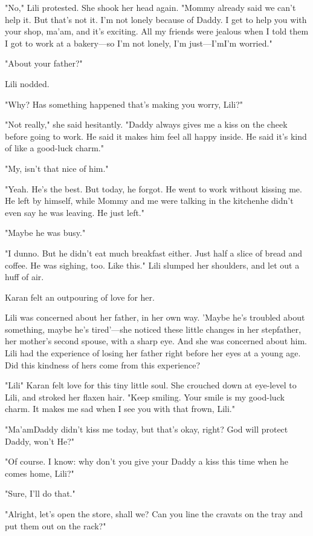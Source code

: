 "No," Lili protested. She shook her head again. "Mommy already said we
can't help it. But that's not it. I'm not lonely because of Daddy. I get
to help you with your shop, ma'am, and it's exciting. All my friends
were jealous when I told them I got to work at a bakery---so I'm not
lonely, I'm just---I'm\el I'm worried."

"About your father?"

Lili nodded.

"Why? Has something happened that's making you worry, Lili?"

"Not really," she said hesitantly. "Daddy always gives me a kiss on the
cheek before going to work. He said it makes him feel all happy inside.
He said it's kind of like a good-luck charm."

"My, isn't that nice of him."

"Yeah. He's the best. But today, he forgot. He went to work without
kissing me. He left by himself, while Mommy and me were talking in the
kitchen\el he didn't even say he was leaving. He just left."

"Maybe he was busy."

"I dunno. But he didn't eat much breakfast either. Just half a slice of
bread and coffee. He was sighing, too. Like this." Lili slumped her
shoulders, and let out a huff of air.

Karan felt an outpouring of love for her.

Lili was concerned about her father, in her own way. 'Maybe he's
troubled about something, maybe he's tired'---she noticed these little
changes in her stepfather, her mother's second spouse, with a sharp eye.
And she was concerned about him. Lili had the experience of losing her
father right before her eyes at a young age. Did this kindness of hers
come from this experience?

"Lili\el " Karan felt love for this tiny little soul. She crouched down
at eye-level to Lili, and stroked her flaxen hair. "Keep smiling. Your
smile is my good-luck charm. It makes me sad when I see you with that
frown, Lili."

"Ma'am\el Daddy didn't kiss me today, but that's okay, right? God will
protect Daddy, won't He?"

"Of course. I know: why don't you give your Daddy a kiss this time when
he comes home, Lili?"

"Sure, I'll do that."

"Alright, let's open the store, shall we? Can you line the cravats on
the tray and put them out on the rack?"

